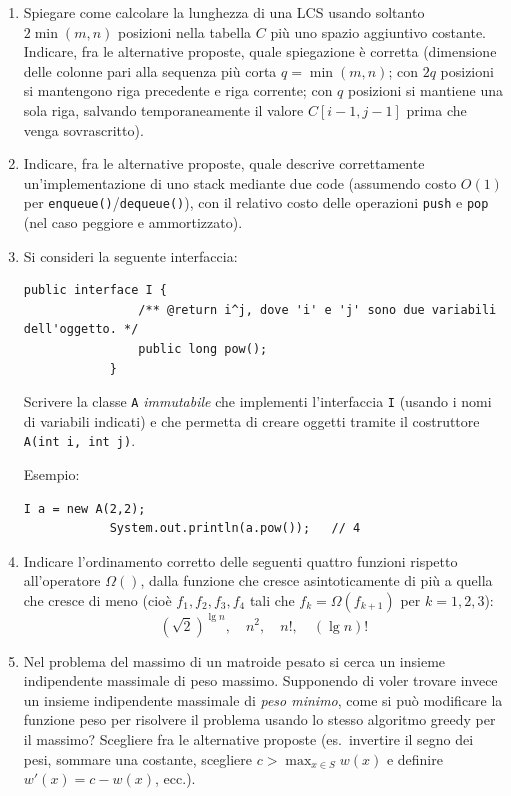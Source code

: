 \begin{enumerate}
		\item Spiegare come calcolare la lunghezza di una LCS usando soltanto $2\min(m,n)$ posizioni nella tabella $C$ più uno spazio aggiuntivo costante. Indicare, fra le alternative proposte, quale spiegazione è corretta (dimensione delle colonne pari alla sequenza più corta $q=\min(m,n)$; con $2q$ posizioni si mantengono riga precedente e riga corrente; con $q$ posizioni si mantiene una sola riga, salvando temporaneamente il valore $C[i-1,j-1]$ prima che venga sovrascritto).
		
		\item Indicare, fra le alternative proposte, quale descrive correttamente un'implementazione di uno stack mediante due code (assumendo costo $O(1)$ per \texttt{enqueue()}/\texttt{dequeue()}), con il relativo costo delle operazioni \texttt{push} e \texttt{pop} (nel caso peggiore e ammortizzato).
		
		\item Si consideri la seguente interfaccia:
		\begin{lstlisting}[style=java]
			public interface I {
				/** @return i^j, dove 'i' e 'j' sono due variabili dell'oggetto. */
				public long pow();
			}
		\end{lstlisting}
		Scrivere la classe \texttt{A} \emph{immutabile} che implementi l'interfaccia \texttt{I} (usando i nomi di variabili indicati) e che permetta di creare oggetti tramite il costruttore \texttt{A(int i, int j)}.
		
		Esempio:
		\begin{lstlisting}[style=java]
			I a = new A(2,2);
			System.out.println(a.pow());   // 4
		\end{lstlisting}
		
		\item Indicare l'ordinamento corretto delle seguenti quattro funzioni rispetto all'operatore $\Omega()$, dalla funzione che cresce asintoticamente di più a quella che cresce di meno (cioè $f_1,f_2,f_3,f_4$ tali che $f_k=\Omega(f_{k+1})$ per $k=1,2,3$):
		\[
		(\sqrt{2})^{\lg n}, \quad n^2, \quad n!, \quad (\lg n)!
		\]
		
		\item Nel problema del massimo di un matroide pesato si cerca un insieme indipendente massimale di peso massimo. Supponendo di voler trovare invece un insieme indipendente massimale di \emph{peso minimo}, come si può modificare la funzione peso per risolvere il problema usando lo stesso algoritmo greedy per il massimo? Scegliere fra le alternative proposte (es.\ invertire il segno dei pesi, sommare una costante, scegliere $c>\max_{x\in S} w(x)$ e definire $w'(x)=c-w(x)$, ecc.).
		
	\end{enumerate}
	
